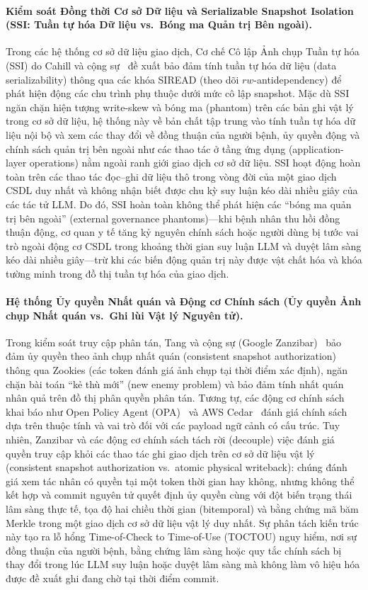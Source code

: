 \documentclass[11pt]{article}
\begin{document}
\paragraph{Kiểm soát Đồng thời Cơ sở Dữ liệu và Serializable Snapshot Isolation (SSI: Tuần tự hóa Dữ liệu vs.\ Bóng ma Quản trị Bên ngoài).}
Trong các hệ thống cơ sở dữ liệu giao dịch, Cơ chế Cô lập Ảnh chụp Tuần tự hóa (SSI) do Cahill và cộng sự~\cite{cahill2008,cahill2009} đề xuất bảo đảm tính tuần tự hóa dữ liệu (data serializability) thông qua các khóa SIREAD (theo dõi $rw$-antidependency) để phát hiện động các chu trình phụ thuộc dưới mức cô lập snapshot. Mặc dù SSI ngăn chặn hiện tượng write-skew và bóng ma (phantom) trên các bản ghi vật lý trong cơ sở dữ liệu, hệ thống này về bản chất tập trung vào tính tuần tự hóa dữ liệu nội bộ và xem các thay đổi về đồng thuận của người bệnh, ủy quyền động và chính sách quản trị bên ngoài như các thao tác ở tầng ứng dụng (application-layer operations) nằm ngoài ranh giới giao dịch cơ sở dữ liệu. SSI hoạt động hoàn toàn trên các thao tác đọc--ghi dữ liệu thô trong vòng đời của một giao dịch CSDL duy nhất và không nhận biết được chu kỳ suy luận kéo dài nhiều giây của các tác tử LLM. Do đó, SSI hoàn toàn không thể phát hiện các ``bóng ma quản trị bên ngoài'' (external governance phantoms)---khi bệnh nhân thu hồi đồng thuận động, cơ quan y tế tăng kỷ nguyên chính sách hoặc người dùng bị tước vai trò ngoài động cơ CSDL trong khoảng thời gian suy luận LLM và duyệt lâm sàng kéo dài nhiều giây---trừ khi các biến động quản trị này được vật chất hóa và khóa tường minh trong đồ thị tuần tự hóa của giao dịch.

\paragraph{Hệ thống Ủy quyền Nhất quán và Động cơ Chính sách (Ủy quyền Ảnh chụp Nhất quán vs.\ Ghi lùi Vật lý Nguyên tử).}
Trong kiểm soát truy cập phân tán, Tang và cộng sự (Google Zanzibar)~\cite{zanzibar2019} bảo đảm ủy quyền theo ảnh chụp nhất quán (consistent snapshot authorization) thông qua Zookies (các token đánh giá ảnh chụp tại thời điểm xác định), ngăn chặn bài toán ``kẻ thù mới'' (new enemy problem) và bảo đảm tính nhất quán nhân quả trên đồ thị phân quyền phân tán. Tương tự, các động cơ chính sách khai báo như Open Policy Agent (OPA)~\cite{opa} và AWS Cedar~\cite{cedar} đánh giá chính sách dựa trên thuộc tính và vai trò đối với các payload ngữ cảnh có cấu trúc. Tuy nhiên, Zanzibar và các động cơ chính sách tách rời (decouple) việc đánh giá quyền truy cập khỏi các thao tác ghi giao dịch trên cơ sở dữ liệu vật lý (consistent snapshot authorization vs.\ atomic physical writeback): chúng đánh giá xem tác nhân có quyền tại một token thời gian hay không, nhưng không thể kết hợp và commit nguyên tử quyết định ủy quyền cùng với đột biến trạng thái lâm sàng thực tế, tọa độ hai chiều thời gian (bitemporal) và bằng chứng mã băm Merkle trong một giao dịch cơ sở dữ liệu vật lý duy nhất. Sự phân tách kiến trúc này tạo ra lỗ hổng Time-of-Check to Time-of-Use (TOCTOU) nguy hiểm, nơi sự đồng thuận của người bệnh, bằng chứng lâm sàng hoặc quy tắc chính sách bị thay đổi trong lúc LLM suy luận hoặc duyệt lâm sàng mà không làm vô hiệu hóa được đề xuất ghi đang chờ tại thời điểm commit.
\end{document}

